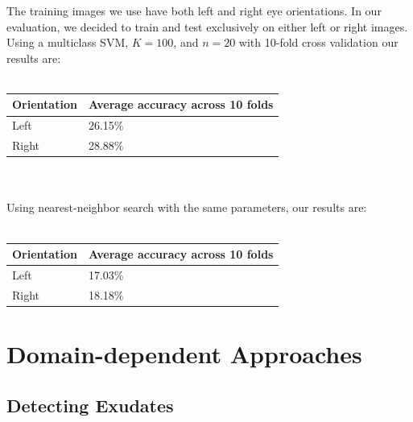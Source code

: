 \documentclass{article} %
\begin{document}
The training images we use have both left and right eye orientations. In our evaluation, we decided to train and test exclusively on either left or right images. Using a multiclass SVM, $K=100$, and $n=20$ with 10-fold cross validation our results are: \\ \\
\begin{tabular}{| l | l |}
\hline
Orientation & Average accuracy across 10 folds \\ \hline
Left & 26.15\% \\ \hline
Right & 28.88\% \\ \hline
\end{tabular} \\ \\
Using nearest-neighbor search with the same parameters, our results are: \\ \\
\begin{tabular}{| l | l |}
\hline
Orientation & Average accuracy across 10 folds \\ \hline
Left & 17.03\% \\ \hline
Right & 18.18\% \\ \hline
\end{tabular} 

\section{Domain-dependent Approaches}
\subsection{Detecting Exudates}
\end{document}
